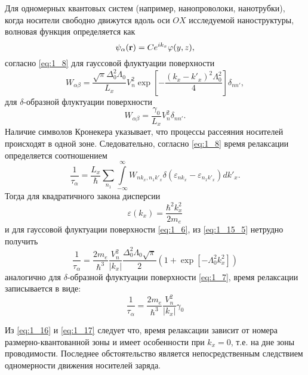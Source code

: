 Для одномерных квантовых систем (например, нанопроволоки, нанотрубки), когда носители свободно движутся вдоль оси $OX$ исследуемой наноструктуры, волновая функция определяется как
\[
\psi_\alpha(\boldsymbol{\mathbf{r}})=Ce^{ik_x}\varphi(y,z),
\]
согласно \eqref{eq:1_8} для гауссовой флуктуации поверхности
\begin{equation}
W_{\alpha\beta }=\frac{\sqrt{\pi}\Delta^2_0\Lambda_0}{L_x}  V_n^2 \exp\left[-\frac{(k_x-k'_x)^2\Lambda^2_0}{4}\right] \delta_{nn'},
\end{equation}
для $\delta$-образной флуктуации поверхности
\begin{equation}
W_{\alpha\beta }=\frac{\gamma_0}{L_x} V_n^2 \delta_{nn'}.
\end{equation}
Наличие символов Кронекера указывает, что процессы рассеяния носителей происходят в одной зоне. Следовательно, согласно \eqref{eq:1_8} время релаксации определяется соотношением
\begin{equation} \label{eq:1_15_5}
\frac{1}{\tau_\alpha}=\frac{L_x}{\hbar }\sum\limits_{n_1}\int\limits^\infty_{-\infty }{W_{n k_x, n_1 k'_x}\delta(\varepsilon_{n k_x}-\varepsilon_{n_1 k'_x})dk'_x}.
\end{equation}
Тогда для квадратичного закона дисперсии
\[
\varepsilon(k_x)=\frac{\hbar^2 k^2_x}{2m_e} 
\] 
и для гауссовой флуктуации поверхности \eqref{eq:1_6}, из \eqref{eq:1_15_5} нетрудно получить  
\begin{equation} \label{eq:1_16}
\frac{1}{\tau_\alpha}=\frac{2 m_e}{\hbar^3} \frac{V_n^2}{\left|k_x\right|} \frac{\Delta^2_0\Lambda_0\sqrt{\pi}}{2} \left(1+\exp\left[-\Lambda^2_0 k^2_x \right] \right)
\end{equation}
аналогично для $\delta$-образной флуктуации поверхности \eqref{eq:1_7}, время релаксации записывается в виде:
\begin{equation} \label{eq:1_17}
\frac{1}{\tau_\alpha}=\frac{2 m_e}{\hbar^3} \frac{V_n^2}{\left|k_x\right|}\gamma_0
\end{equation}

Из \eqref{eq:1_16} и \eqref{eq:1_17} следует что, время релаксации зависит от номера размерно-квантованной зоны и имеет особенности при $k_x=0$, т.е. на дне зоны проводимости. Последнее обстоятельство является непосредственным следствием одномерности движения носителей заряда. 

